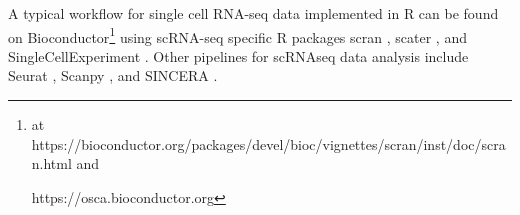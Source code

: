 
A typical workflow for single cell RNA-seq data implemented in R can be found on Bioconductor\footnote{at https://bioconductor.org/packages/devel/bioc/vignettes/scran/inst/doc/scran.html and

https://osca.bioconductor.org} using scRNA-seq specific R packages scran \cite{lun2016step, risso2016scrnaseq}, scater \cite{mccarthy2017scater}, and SingleCellExperiment 
\cite{lun2019singlecellexperiment}.
Other pipelines for scRNAseq data analysis include 
Seurat \cite{butler2018integrating},
Scanpy \cite{wolf2018scanpy}, 
and SINCERA \cite{guo2015sincera}.














